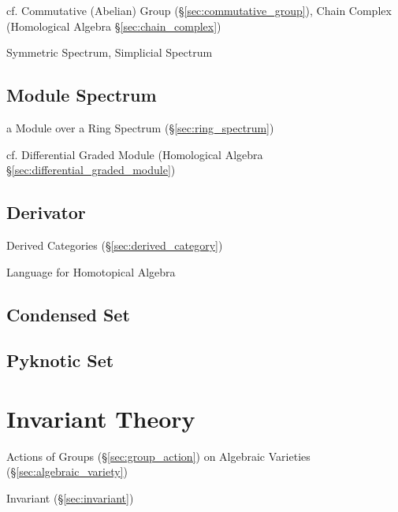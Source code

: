 cf. Commutative (Abelian) Group (\S\ref{sec:commutative_group}), Chain Complex
(Homological Algebra \S\ref{sec:chain_complex})

Symmetric Spectrum, Simplicial Spectrum



\subsection{Module Spectrum}\label{sec:module_spectrum}

a Module over a Ring Spectrum (\S\ref{sec:ring_spectrum})

cf. Differential Graded Module (Homological Algebra
\S\ref{sec:differential_graded_module})



\subsection{Derivator}\label{sec:derivator}

Derived Categories (\S\ref{sec:derived_category})

Language for Homotopical Algebra



\subsection{Condensed Set}\label{sec:condensed_set}

\subsection{Pyknotic Set}\label{sec:pyknotic_set}



\section{Invariant Theory}\label{sec:invariant_theory}

Actions of Groups (\S\ref{sec:group_action}) on Algebraic Varieties
(\S\ref{sec:algebraic_variety})

Invariant (\S\ref{sec:invariant})
